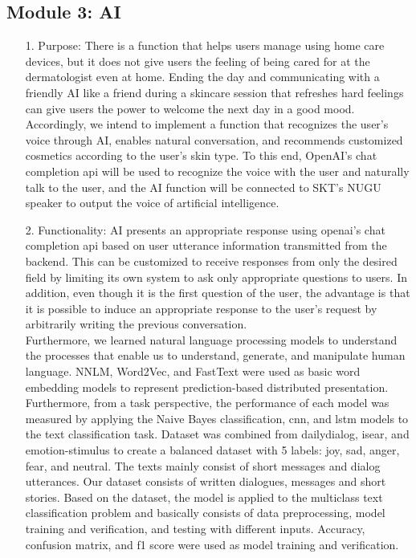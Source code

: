 \documentclass[conference]{IEEEtran}
\begin{document}
\subsection{Module 3: AI}
\begin{itemize}
    \item [1.] Purpose: There is a function that helps users manage using home care devices, but it does not give users the feeling of being cared for at the dermatologist even at home. Ending the day and communicating with a friendly AI like a friend during a skincare session that refreshes hard feelings can give users the power to welcome the next day in a good mood. Accordingly, we intend to implement a function that recognizes the user's voice through AI, enables natural conversation, and recommends customized cosmetics according to the user's skin type. To this end, OpenAI's chat completion api will be used to recognize the voice with the user and naturally talk to the user, and the AI function will be connected to SKT's NUGU speaker to output the voice of artificial intelligence.
 \\ 
    \item[2.] Functionality: AI presents an appropriate response using openai's chat completion api based on user utterance information transmitted from the backend. This can be customized to receive responses from only the desired field by limiting its own system to ask only appropriate questions to users. In addition, even though it is the first question of the user, the advantage is that it is possible to induce an appropriate response to the user's request by arbitrarily writing the previous conversation.\\
    Furthermore, we learned natural language processing models to understand the processes that enable us to understand, generate, and manipulate human language. NNLM, Word2Vec, and FastText were used as basic word embedding models to represent prediction-based distributed presentation. Furthermore, from a task perspective, the performance of each model was measured by applying the Naive Bayes classification, cnn, and lstm models to the text classification task. Dataset was combined from dailydialog, isear, and emotion-stimulus to create a balanced dataset with 5 labels: joy, sad, anger, fear, and neutral. The texts mainly consist of short messages and dialog utterances. Our dataset consists of written dialogues, messages and short stories. Based on the dataset, the model is applied to the multiclass text classification problem and basically consists of data preprocessing, model training and verification, and testing with different inputs. Accuracy, confusion matrix, and f1 score were used as model training and verification.
\\
    

\end{itemize}
\end{document}
